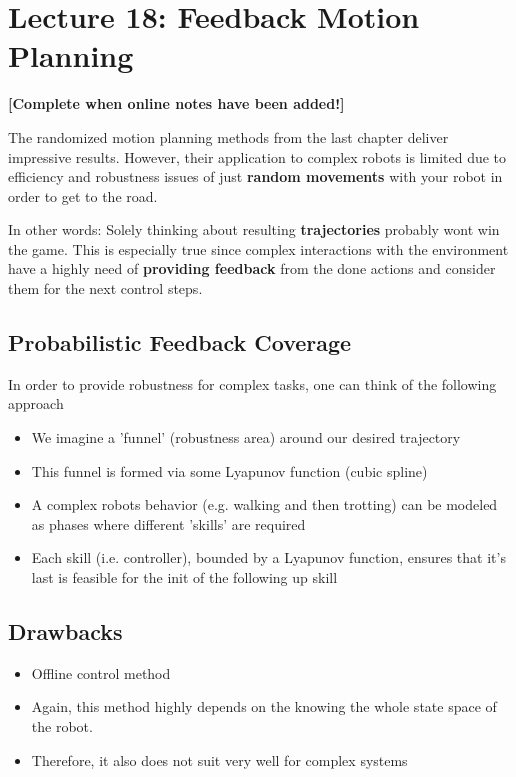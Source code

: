 \chapter{Lecture 18: Feedback Motion Planning}
\textbf{[Complete when online notes have been added!]} 

The randomized motion planning methods from the last chapter deliver impressive results. However, their application to complex robots is limited due to efficiency and robustness issues of just \textbf{random movements} with your robot in order to get to the road. 

In other words: Solely thinking about resulting \textbf{trajectories} probably wont win the game. This is especially true since complex interactions with the environment have a highly need of \textbf{providing feedback} from the done actions and consider them for the next control steps. 

\section{Probabilistic Feedback Coverage}
In order to provide robustness for complex tasks, one can think of the following approach
\begin{itemize}
\item We imagine a 'funnel' (robustness area) around our desired trajectory
\item This funnel is formed via some Lyapunov function (cubic spline)
\item A complex robots behavior (e.g. walking and then trotting) can be modeled as phases where different 'skills' are required
\item Each skill (i.e. controller), bounded by a Lyapunov function, ensures that it's last is feasible for the init of the following up skill 
\end{itemize}

\section{Drawbacks}
\begin{itemize}
\item Offline control method
\item Again, this method highly depends on the knowing the whole state space of the robot. 
\item Therefore, it also does not suit very well for complex systems
\end{itemize}